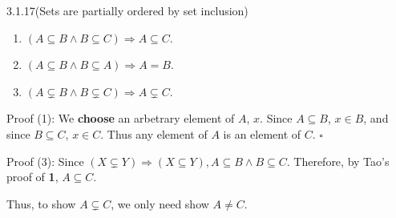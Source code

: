 \documentclass[letterpaper]{article}
\begin{document}
\begin{prbox}{3.1.17}{(Sets are partially ordered by set inclusion)}
  \vspace{-0.5cm}
  \begin{enumerate}
    \item $(A \subseteq B \land B \subseteq C) \Rightarrow A \subseteq C$.
    \item $(A \subseteq B \land B \subseteq A) \Rightarrow A = B$.
    \item $(A \subsetneq B \land B \subsetneq C) \Rightarrow A \subsetneq C$.
  \end{enumerate}

  \begin{paragraph}{Proof (1):}
    We \textbf{choose} an arbetrary element of $A$, $x$. Since $A \subseteq B$, $x \in B$, and since $B \subseteq C$, $x \in C$. Thus any element of $A$ is an element of $C$. $\square$
  \end{paragraph}

\vspace{7cm}

  \begin{paragraph}{Proof (3):}
    Since $(X \subsetneq Y)\Rightarrow (X \subseteq Y), A \subseteq B \land B \subseteq C$. Therefore, by Tao's proof of \textbf{1}, $A \subseteq C$.

    \medskip

    Thus, to show $A \subsetneq C$, we only need show $A \neq C$.

    \medskip

  \end{paragraph}


\end{prbox}
\end{document}
